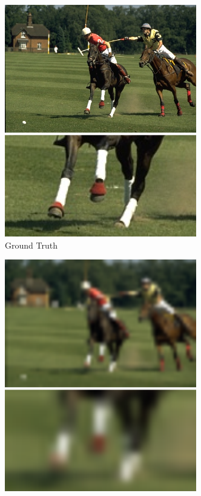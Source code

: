 \begin{figure}[t]
  \begin{subfigure}[b]{0.244\textwidth}
    \includegraphics[width=\textwidth]{gfx/app-super-res-1}
    \caption{Ground Truth}
  \end{subfigure}
  \begin{subfigure}[b]{0.244\textwidth}
    \includegraphics[width=\textwidth]{gfx/app-super-res-2}

\end{subfigure}
\end{figure}
